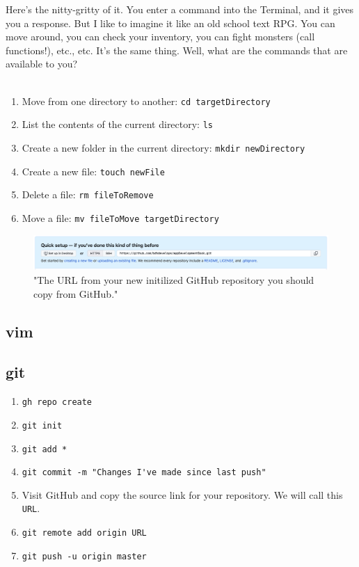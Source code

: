 \documentclass[12pt, letterpaper]{article}
\begin{document}
Here's the nitty-gritty of it. You enter a command into the Terminal, and it gives you a response. But I like to imagine it
like an old school text RPG. You can move around, you can check your inventory, you can fight monsters (call functions!),
etc., etc. It's the same thing. Well, what are the commands that are available to you? \\\

\begin{enumerate}
    \itemsep0em
    \item{Move from one directory to another: \verb+cd targetDirectory+}
    \item{List the contents of the current directory: \verb+ls+}
    \item{Create a new folder in the current directory: \verb+mkdir newDirectory+}
    \item{Create a new file: \verb+touch newFile+}
    \item{Delete a file: \verb+rm fileToRemove+}
    \item{Move a file: \verb+mv fileToMove targetDirectory+}
\end{enumerate}

\begin{figure}[ht]
    \centering
        \includegraphics[scale=.3]{git_repository_URL_screenshot}
    \caption{"The URL from your new initilized GitHub repository you should copy from GitHub."}
\end{figure}

\subsection*{vim}

\subsection*{git}

\begin{enumerate}
    \itemsep0em
    \item{\verb+gh repo create+}
    \item{\verb+git init+}
    \item{\verb+git add *+}
    \item{\verb+git commit -m "Changes I've made since last push"+}
    \item{Visit GitHub and copy the source link for your repository. We will call this \verb+URL+.}
    \item{\verb+git remote add origin URL+}
    \item{\verb+git push -u origin master+}
\end{enumerate}
\end{document}
